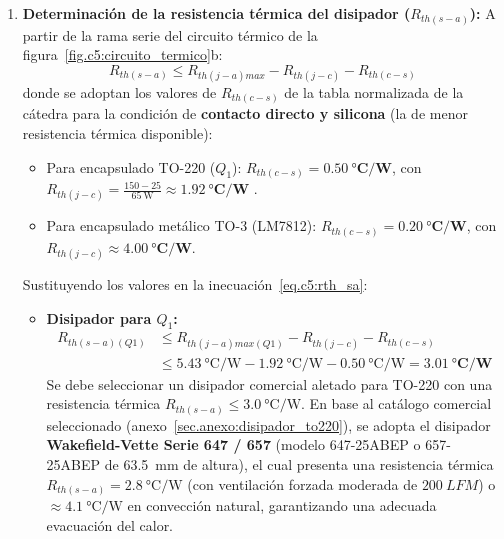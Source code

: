 \begin{enumerate}
    \item \textbf{Determinación de la resistencia térmica del disipador ($R_{th(s-a)}$):}  
    A partir de la rama serie del circuito térmico de la figura~\ref{fig.c5:circuito_termico}b:
    \begin{equation}
        R_{th(s-a)} \le R_{th(j-a)max} - R_{th(j-c)} - R_{th(c-s)}
        \label{eq.c5:rth_sa}
    \end{equation}
    donde se adoptan los valores de $R_{th(c-s)}$ de la tabla normalizada de la cátedra para la condición de
    \textbf{contacto directo y silicona} (la de menor resistencia térmica disponible):
    \begin{itemize}
        \item Para encapsulado TO-220 ($Q_1$): $R_{th(c-s)} = \mathbf{\SI{0.50}{\celsius/\watt}}$, con $R_{th(j-c)} = \frac{150 - 25}{\SI{65}{\watt}} \approx \mathbf{\SI{1.92}{\celsius/\watt}}$ \cite{onsemi_tip42c}.
        \item Para encapsulado metálico TO-3 (LM7812): $R_{th(c-s)} = \mathbf{\SI{0.20}{\celsius/\watt}}$, con $R_{th(j-c)} \approx \mathbf{\SI{4.00}{\celsius/\watt}}$.
    \end{itemize}
    Sustituyendo los valores en la inecuación~\eqref{eq.c5:rth_sa}:
    \begin{itemize}
        \item \textbf{Disipador para $Q_1$:}
        \begin{align*}
            R_{th(s-a)(Q1)} &\le R_{th(j-a)max(Q1)} - R_{th(j-c)} - R_{th(c-s)} \\
            &\le \SI{5.43}{\celsius/\watt} - \SI{1.92}{\celsius/\watt} - \SI{0.50}{\celsius/\watt} = \mathbf{\SI{3.01}{\celsius/\watt}}
        \end{align*}
        Se debe seleccionar un disipador comercial aletado para TO-220 con una resistencia térmica $R_{th(s-a)} \le \SI{3.0}{\celsius/\watt}$. En base al catálogo comercial seleccionado (anexo~\ref{sec.anexo:disipador_to220}), se adopta el disipador \textbf{Wakefield-Vette Serie 647 / 657} (modelo 647-25ABEP o 657-25ABEP de \SI{63.5}{\milli\meter} de altura), el cual presenta una resistencia térmica $R_{th(s-a)} = \SI{2.8}{\celsius/\watt}$ (con ventilación forzada moderada de $\SI{200}{LFM}$) o $\approx \SI{4.1}{\celsius/\watt}$ en convección natural, garantizando una adecuada evacuación del calor.
        

\end{itemize}
\end{enumerate}
